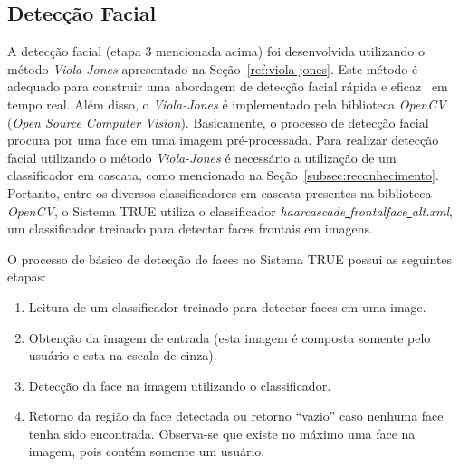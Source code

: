 	\subsection{Detecção Facial}

		A detecção facial (etapa 3 mencionada acima) foi desenvolvida utilizando o método \textit{Viola-Jones} apresentado na Seção~\ref{ref:viola-jones}. Este método é adequado para construir uma abordagem de detecção facial rápida e eficaz~\cite{violajones} em tempo real. Além disso, o \textit{Viola-Jones} é implementado pela biblioteca \textit{OpenCV}~\cite{opencv_library} (\textit{Open Source Computer Vision}). Basicamente, o processo de detecção facial procura por uma face em uma imagem pré-processada. Para realizar detecção facial utilizando o método \textit{Viola-Jones} é necessário a utilização de um classificador em cascata, como mencionado na Seção~\ref{subsec:reconhecimento}. Portanto, entre os diversos classificadores em cascata presentes na biblioteca \textit{OpenCV}, o Sistema TRUE utiliza o classificador \textit{haarcascade\underline{ }frontalface\underline{ }alt.xml}, um classificador treinado para detectar faces frontais em imagens.


		O processo de básico de detecção de faces no Sistema TRUE possui as seguintes etapas:

		\begin{enumerate}
			\item Leitura de um classificador treinado para detectar faces em uma image.
			\item Obtenção da imagem de entrada (esta imagem é composta somente pelo usuário e esta na escala de cinza).
			\item Detecção da face na imagem utilizando o classificador.
			\item Retorno da região da face detectada ou retorno ``vazio'' caso nenhuma face tenha sido encontrada. Observa-se que existe no máximo uma face na imagem, pois contém somente um usuário.
		\end{enumerate}

